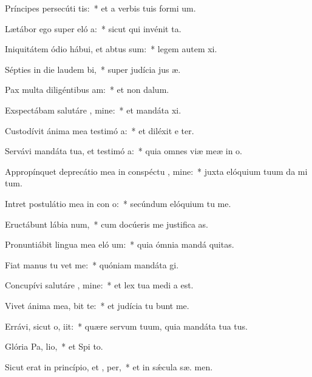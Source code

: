 \item Príncipes persecúti   tis:~* et a verbis tuis formi  um.
\item Lætábor ego super eló a:~* sicut qui invénit  ta.
\item Iniquitátem ódio hábui, et abtus sum:~* legem autem  xi.
\item Sépties in die laudem  bi,~* super judícia jus æ.
\item Pax multa diligéntibus  am:~* et non   dalum.
\item Exspectábam salutáre , mine:~* et mandáta  xi.
\item Custodívit ánima mea testimó a:~* et diléxit e ter.
\item Servávi mandáta tua, et testimó a:~* quia omnes viæ meæ in  o.
\item Appropínquet deprecátio mea in conspéctu , mine:~* juxta elóquium tuum da mi tum.
\item Intret postulátio mea in con o:~* secúndum elóquium tu  me.
\item Eructábunt lábia  num,~* cum docúeris me justifica as.
\item Pronuntiábit lingua mea eló um:~* quia ómnia mandá  quitas.
\item Fiat manus tu  vet me:~* quóniam mandáta  gi.
\item Concupívi salutáre , mine:~* et lex tua medi a est.
\item Vivet ánima mea,  bit te:~* et judícia tu bunt me.
\item Errávi, sicut o,  iit:~* quære servum tuum, quia mandáta tua   tus.
\item Glória Pa,  lio,~* et Spi to.
\item Sicut erat in princípio, et ,  per,~* et in sǽcula sæ. men.

